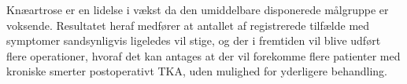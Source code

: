 
Knæartrose er en lidelse i vækst da den umiddelbare disponerede målgruppe er voksende. Resultatet heraf medfører at antallet af registrerede tilfælde med symptomer sandsynligvis ligeledes vil stige, og der i fremtiden vil blive udført flere operationer, hvoraf det kan antages at der vil forekomme flere patienter med kroniske smerter postoperativt TKA, uden mulighed for yderligere behandling.

